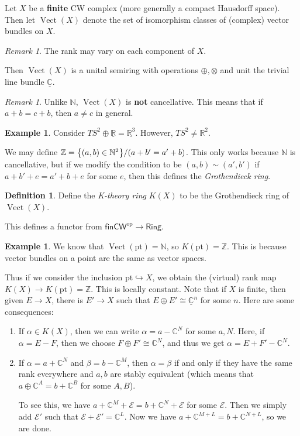 \documentclass[leqno, openany]{memoir}
\theoremstyle{definition}
\newtheorem{defn}[thm]{Definition}
\newtheorem{exm}[thm]{Example}
\theoremstyle{remark}
\newtheorem{rmk}[thm]{Remark}
\theoremstyle{plain}
\theoremstyle{definition}
\theoremstyle{remark}
\newcommand{\N}{\mathbb{N}}
\newcommand{\R}{\mathbb{R}}
\newcommand{\C}{\mathbb{C}}
\newcommand{\Z}{\mathbb{Z}}
\newcommand{\msc}[1]{\mathscr{#1}}
\newcommand{\mr}[1]{\mathrm{#1}}
\newcommand{\ms}[1]{\mathsf{#1}}
\newcommand{\ul}[1]{\underline{#1}}
\DeclareMathOperator{\Vect}{Vect}
\begin{document}
Let $X$ be a \textbf{finite} CW complex (more generally a compact Hausdorff space). Then let $\Vect(X)$ denote the set of isomorphism classes of (complex) vector bundles on $X$.

\begin{rmk}
    The rank may vary on each component of $X$.
\end{rmk}

Then $\Vect(X)$ is a unital semiring with operations $\oplus, \otimes$ and unit the trivial line bundle $\underline{\C}$.

\begin{rmk}
    Unlike $\N$, $\Vect(X)$ is \textbf{not} cancellative. This means that if $a+b = c+b$, then $a \neq c$ in general. 
\end{rmk}

\begin{exm}
    Consider $TS^2 \oplus \ul{\R} = \ul{\R^3}$. However, $TS^2 \neq \R^2$.
\end{exm}

We may define $\Z = \qty{(a,b) \in \N^2} / (a+b' = a'+b)$. This only works because $\N$ is cancellative, but if we modify the condition to be $(a,b) \sim (a',b')$ if $a+b'+e = a'+b+e$ for some $e$, then this defines the \textit{Grothendieck ring}.

\begin{defn}
    Define the \textit{K-theory ring} $K(X)$ to be the Grothendieck ring of $\Vect(X)$.  
\end{defn}

This defines a functor from $\ms{finCW}^{\mr{op}} \to \ms{Ring}$.

\begin{exm}
    We know that $\Vect(\mr{pt}) = \N$, so $K(\mr{pt}) = \Z$. This is because vector bundles on a point are the same as vector spaces.
\end{exm}

Thus if we consider the inclusion $\mr{pt} \hookrightarrow X$, we obtain the (virtual) rank map $K(X) \to K(\mr{pt}) = \Z$. This is locally constant. Note that if $X$ is finite, then given $E \to X$, there is $E' \to X$ such that $E \oplus E' \cong \ul{\C}^n$ for some $n$. Here are some consequences:
\begin{enumerate}
    \item If $\alpha \in K(X)$, then we can write $\alpha = a - \C^N$ for some $a, N$. Here, if $\alpha = E-F$, then we choose $F \oplus F' \cong \C^N$, and thus we get $\alpha = E + F' - \C^N$.
    \item If $\alpha = a + \C^N$ and $\beta = b - \C^M$, then $\alpha = \beta$ if and only if they have the same rank everywhere and $a,b$ are stably equivalent (which means that $a \oplus \C^A = b + \C^B$ for some $A,B$).

        To see this, we have $a + \C^M + \msc{E} = b + \C^N + \msc{E}$ for some $\msc{E}$. Then we simply add $\msc{E}'$ such that $\msc{E} + \msc{E}' = \C^L$. Now we have $a + \C^{M+L} = b + \C^{N+L}$, so we are done.
\end{enumerate}
\end{document}
